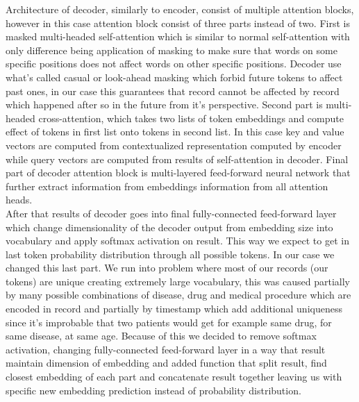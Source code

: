 Architecture of decoder, similarly to encoder, consist of multiple attention blocks, however in this case attention block consist of three parts instead of two. First is masked multi-headed self-attention which is similar to normal self-attention with only difference being application of masking to make sure that words on some specific positions does not affect words on other specific positions. Decoder use what's called casual or look-ahead masking which forbid future tokens to affect past ones, in our case this guarantees that record cannot be affected by record which happened after so in the future from it's perspective. Second part is multi-headed cross-attention, which takes two lists of token embeddings and compute effect of tokens in first list onto tokens in second list. In this case key and value vectors are computed from contextualized representation computed by encoder while query vectors are computed from results of self-attention in decoder. Final part of decoder attention block is multi-layered feed-forward neural network that further extract information from embeddings information from all attention heads. 
\\

After that results of decoder goes into final fully-connected feed-forward layer which change dimensionality of the decoder output from embedding size into vocabulary and apply softmax activation on result. This way we expect to get in last token probability distribution through all possible tokens. In our case we changed this last part. We run into problem where most of our records (our tokens) are unique creating extremely large vocabulary, this was caused partially by many possible combinations of disease, drug and medical procedure which are encoded in record and partially by timestamp which add additional uniqueness since it's improbable that two patients would get for example same drug, for same disease, at same age. Because of this we decided to remove softmax activation, changing fully-connected feed-forward layer in a way that result maintain dimension of embedding and added function that split result, find closest embedding of each part and concatenate result together leaving us with specific new embedding prediction instead of probability distribution.
\\


